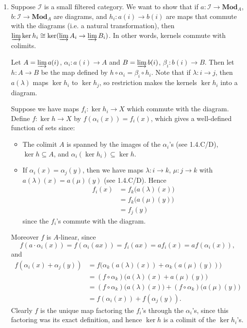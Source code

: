 \documentclass{report}
\newcommand{\cat}[1]{\mathbf{#1}} %
\newcommand{\colimit}{\varinjlim} %
\newcommand{\I}{\mathscr{I}}
\begin{document}
\begin{enumerate}[label=\textbf{1.6.\Alph*.}]
	\item Suppose $\I$ is a small filtered category. We want to show
	      that if $a:\I\to\cat{Mod}_A$, $b:\I\to\cat{Mod}_A$
	      are diagrams, and $h_i:a(i)\to b(i)$ are maps that commute with the
	      diagrams (i.e. a natural transformation), then
	      $\colimit\ker h_i\cong\ker(\colimit A_i\to\colimit B_i)$. In
	      other words, kernels commute with colimits.

	      Let $A=\colimit a(i)$, $\alpha_i:a(i)\to A$ and $B=\colimit b(i)$,
	      $\beta_i:b(i)\to B$. Then let $h:A\to B$ be the map defined by
	      $h\circ\alpha_i=\beta_i\circ h_i$. Note that if $\lambda:i\to j$, then
	      $a(\lambda)$ maps $\ker h_i$ to $\ker h_j$, so restriction makes the
	      kernels $\ker h_i$ into a diagram.

	      Suppose we have maps $f_i:\ker h_i\to X$ which commute with the
	      diagram. Define $f:\ker h\to X$ by $f(\alpha_i(x))=f_i(x)$, which gives a
	      well-defined function of sets since:
	      \begin{itemize}
		      \item The colimit $A$ is spanned by the images of the $\alpha_i$'s
		            (see 1.4.C/D), $\ker h\subseteq A$, and
		            $\alpha_i(\ker h_i)\subseteq\ker h$.

		      \item If $\alpha_i(x)=\alpha_j(y)$, then we have maps
		            $\lambda:i\to k$, $\mu:j\to k$ with $a(\lambda)(x)=a(\mu)(y)$
		            (see 1.4.C/D). Hence
		            \begin{align*}
			            f_i(x)
			             & = f_k\bigl(a(\lambda)(x)\bigr) \\
			             & = f_k\bigl(a(\mu)(y)\bigr)     \\
			             & = f_j(y)
		            \end{align*}
		            since the $f_i$'s commute with the diagram.
	      \end{itemize}
	      Moreover $f$ is $A$-linear, since
	      \begin{equation*}
		      f(a\cdot\alpha_i(x))
		      = f(\alpha_i(ax))
		      = f_i(ax)
		      = af_i(x)
		      = af(\alpha_i(x)),
	      \end{equation*}
	      and
	      \begin{align*}
		      f(\alpha_i(x)+\alpha_j(y))
		       & = f\bigl(\alpha_k(a(\lambda)(x))+\alpha_k(a(\mu)(y))\bigr) \\
		       & = (f\circ\alpha_k)\bigl(a(\lambda)(x)+a(\mu)(y)\bigr)      \\
		       & = (f\circ\alpha_k)\bigl(a(\lambda)(x)\bigr)
		      + (f\circ\alpha_k)\bigl(a(\mu)(y)\bigr)                       \\
		       & = f(\alpha_i(x)) + f(\alpha_j(y)).
	      \end{align*}
	      Clearly $f$ is the unique map factoring the $f_i$'s through the
	      $\alpha_i$'s, since this factoring was its exact definition, and hence
	      $\ker h$ is a colimit of the $\ker h_i$'s.


\end{enumerate}
\end{document}
